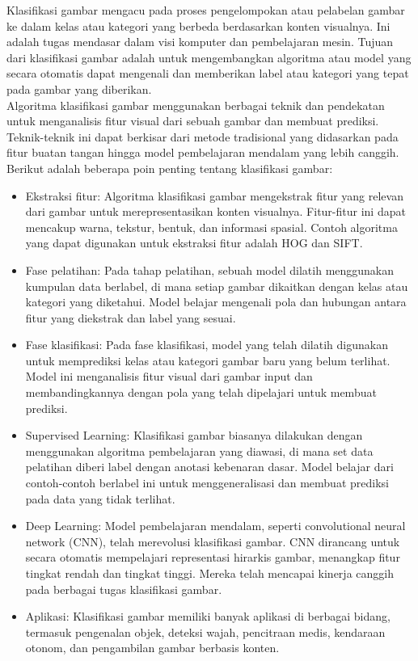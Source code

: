 \documentclass[
  letterpaper,
  DIV=11,
  numbers=noendperiod]{scrreprt}
\providecommand{\tightlist}{%
  \setlength{\itemsep}{0pt}\setlength{\parskip}{0pt}}\usepackage{longtable,booktabs,array}
\begin{document}
Klasifikasi gambar mengacu pada proses pengelompokan atau pelabelan
gambar ke dalam kelas atau kategori yang berbeda berdasarkan konten
visualnya. Ini adalah tugas mendasar dalam visi komputer dan
pembelajaran mesin. Tujuan dari klasifikasi gambar adalah untuk
mengembangkan algoritma atau model yang secara otomatis dapat mengenali
dan memberikan label atau kategori yang tepat pada gambar yang
diberikan.\\
Algoritma klasifikasi gambar menggunakan berbagai teknik dan pendekatan
untuk menganalisis fitur visual dari sebuah gambar dan membuat prediksi.
Teknik-teknik ini dapat berkisar dari metode tradisional yang didasarkan
pada fitur buatan tangan hingga model pembelajaran mendalam yang lebih
canggih.\\
Berikut adalah beberapa poin penting tentang klasifikasi gambar:

\begin{itemize}
\tightlist
\item
  Ekstraksi fitur: Algoritma klasifikasi gambar mengekstrak fitur yang
  relevan dari gambar untuk merepresentasikan konten visualnya.
  Fitur-fitur ini dapat mencakup warna, tekstur, bentuk, dan informasi
  spasial. Contoh algoritma yang dapat digunakan untuk ekstraksi fitur
  adalah HOG dan SIFT.\\
\item
  Fase pelatihan: Pada tahap pelatihan, sebuah model dilatih menggunakan
  kumpulan data berlabel, di mana setiap gambar dikaitkan dengan kelas
  atau kategori yang diketahui. Model belajar mengenali pola dan
  hubungan antara fitur yang diekstrak dan label yang sesuai.\\
\item
  Fase klasifikasi: Pada fase klasifikasi, model yang telah dilatih
  digunakan untuk memprediksi kelas atau kategori gambar baru yang belum
  terlihat. Model ini menganalisis fitur visual dari gambar input dan
  membandingkannya dengan pola yang telah dipelajari untuk membuat
  prediksi.\\
\item
  Supervised Learning: Klasifikasi gambar biasanya dilakukan dengan
  menggunakan algoritma pembelajaran yang diawasi, di mana set data
  pelatihan diberi label dengan anotasi kebenaran dasar. Model belajar
  dari contoh-contoh berlabel ini untuk menggeneralisasi dan membuat
  prediksi pada data yang tidak terlihat.
\item
  Deep Learning: Model pembelajaran mendalam, seperti convolutional
  neural network (CNN), telah merevolusi klasifikasi gambar. CNN
  dirancang untuk secara otomatis mempelajari representasi hirarkis
  gambar, menangkap fitur tingkat rendah dan tingkat tinggi. Mereka
  telah mencapai kinerja canggih pada berbagai tugas klasifikasi gambar.
\item
  Aplikasi: Klasifikasi gambar memiliki banyak aplikasi di berbagai
  bidang, termasuk pengenalan objek, deteksi wajah, pencitraan medis,
  kendaraan otonom, dan pengambilan gambar berbasis konten.
\end{itemize}
\end{document}
